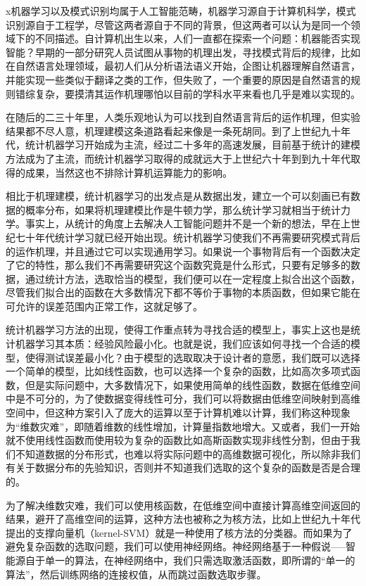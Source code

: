 x机器学习以及模式识别均属于人工智能范畴，机器学习源自于计算机科学，模式识别源自于工程学，尽管这两者源自于不同的背景，但这两者可以认为是同一个领域下的不同描述。自计算机出生以来，人们一直都在探索一个问题：机器能否实现智能？早期的一部分研究人员试图从事物的机理出发，寻找模式背后的规律，比如在自然语言处理领域，最初人们从分析语法语义开始，企图让机器理解自然语言，并能实现一些类似于翻译之类的工作，但失败了，一个重要的原因是自然语言的规则错综复杂，要摸清其运作机理哪怕以目前的学科水平来看也几乎是难以实现的。

在随后的二三十年里，人类乐观地认为可以找到自然语言背后的运作机理，但实验结果都不尽人意，机理建模这条道路看起来像是一条死胡同。到了上世纪九十年代，统计机器学习开始成为主流，经过二十多年的高速发展，目前基于统计的建模方法成为了主流，而统计机器学习取得的成就远大于上世纪六十年到到九十年代取得的成果，当然这也不排除计算机运算能力的影响。

相比于机理建模，统计机器学习的出发点是从数据出发，建立一个可以刻画已有数据的概率分布，如果将机理建模比作是牛顿力学，那么统计学习就相当于统计力学。事实上，从统计的角度上去解决人工智能问题并不是一个新的想法，早在上世纪七十年代统计学习就已经开始出现。统计机器学习使我们不再需要研究模式背后的运作机理，并且通过它可以实现通用学习。如果说一个事物背后有一个函数决定了它的特性，那么我们不再需要研究这个函数究竟是什么形式，只要有足够多的数据，通过统计方法，选取恰当的模型，我们便可以在一定程度上拟合出这个函数，尽管我们拟合出的函数在大多数情况下都不等价于事物的本质函数，但如果它能在可允许的误差范围内正常工作，这就足够了。

统计机器学习方法的出现，使得工作重点转为寻找合适的模型上，事实上这也是统计机器学习其本质：经验风险最小化。也就是说，我们应该如何寻找一个合适的模型，使得测试误差最小化？由于模型的选取取决于设计者的意愿，我们既可以选择一个简单的模型，比如线性函数，也可以选择一个复杂的函数，比如高次多项式函数，但是实际问题中，大多数情况下，如果使用简单的线性函数，数据在低维空间中是不可分的，为了使数据变得线性可分，我们可以将数据由低维空间映射到高维空间中，但这种方案引入了庞大的运算以至于计算机难以计算，我们称这种现象为“维数灾难”，即随着维数的线性增加，计算量指数地增大。又或者，我们一开始就不使用线性函数而使用较为复杂的函数比如高斯函数实现非线性分割，但由于我们不知道数据的分布形式，也难以将实际问题中的高维数据可视化，所以除非我们有关于数据分布的先验知识，否则并不知道我们选取的这个复杂的函数是否是合理的。

为了解决维数灾难，我们可以使用核函数，在低维空间中直接计算高维空间返回的结果，避开了高维空间的运算，这种方法也被称之为核方法，比如上世纪九十年代提出的支撑向量机（kernel-SVM）就是一种使用了核方法的分类器。而如果为了避免复杂函数的选取问题，我们可以使用神经网络。神经网络基于一种假说-----智能源自于单一的算法，在神经网络中，我们只需选取激活函数，即所谓的“单一的算法”，然后训练网络的连接权值，从而跳过函数选取步骤。

